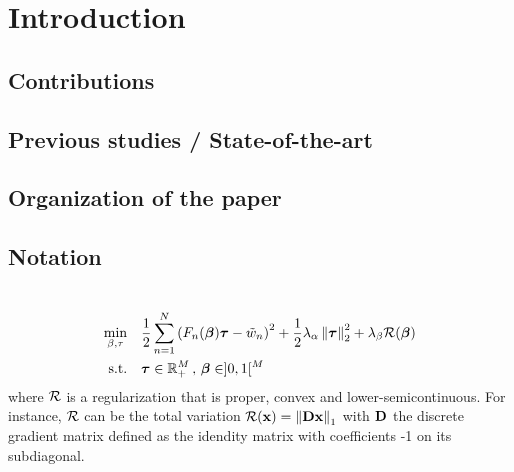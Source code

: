 \section{Introduction}


\subsection{Contributions}


\subsection{Previous studies / State-of-the-art}
\label{ssec:prev_stud}


\subsection{Organization of the paper}


\subsection{Notation}


\section{}


\section{}

\begin{equation}
  \label{eq:optim_pb}
  \begin{aligned}
    \min_{\beta,\tau} \quad &
    \frac{1}{2} \sum_{n=1}^{N} {\left(F_{n}(\bbeta)\btau - \tilde{w}_{n}\right)}^{2}
    +\frac{1}{2}\lambda_{\alpha}\norm{\btau}_{2}^{2} + \lambda_{\beta}\mR(\bbeta) \\
    \textrm{s.t.} \quad &
    \btau \in \RR^{M}_{+} \, , \, \bbeta \in ]0,1[^{M}
  \end{aligned}
\end{equation}
where $\mathcal{R}$ is a regularization that is proper, convex and lower-semicontinuous.
For instance, $\mathcal{R}$ can be the total variation $\mathcal{R}(\mathbf{x})=\left\lVert\mathbf{D}\mathbf{x}\right\rVert_{1}$ with
$\mathbf{D}$ the discrete gradient matrix defined as the idendity matrix with
coefficients -1 on its subdiagonal.

